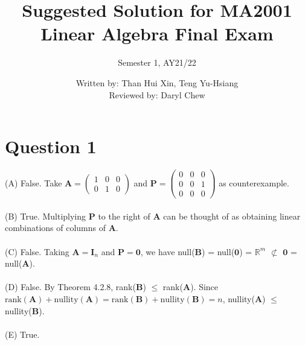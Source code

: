 \documentclass{article}
\title{Suggested Solution for MA2001 Linear Algebra Final Exam}
\author{Semester 1, AY21/22}
\date{Written by: Than Hui Xin, Teng Yu-Hsiang \\
Reviewed by: Daryl Chew}
\begin{document}
\maketitle
\section*{Question 1}

(A) False. Take 
$\mathbf{A} = \begin{pmatrix}
1 & 0 & 0 \\
0 & 1 & 0 
\end{pmatrix}$ and $\mathbf{P} = 
\begin{pmatrix}
0 & 0 & 0 \\
0 & 0 & 1 \\
0 & 0 & 0 
\end{pmatrix}$ as counterexample. \\\\
(B) True. Multiplying $\mathbf{P}$ to the right of $\mathbf{A}$ can be thought of as obtaining linear combinations of columns of $\mathbf{A}$. \\\\
(C) False. Taking $\mathbf{A} = \mathbf{I}_n$ and $\mathbf{P} = \mathbf{0}$, we have null($\mathbf{B}$) = null($\mathbf{0}$) = $\mathbb{R}^m$ $\not \subset$ $\mathbf{0}$ = null($\mathbf{A}$). \\\\
(D) False. By Theorem 4.2.8, rank($\mathbf{B}$) $\leq$ rank($\mathbf{A}$). Since $\text{rank}(\mathbf{A})+\text{nullity}(\mathbf{A}) = \text{rank}(\mathbf{B})+\text{nullity}(\mathbf{B})= n$, nullity($\mathbf{A}$) $\leq$ nullity($\mathbf{B}$). \\\\
(E) True.
\end{document}
